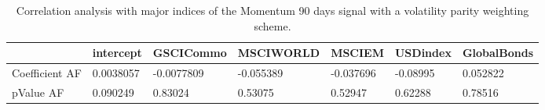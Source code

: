 \begin{table}[H]
\centering
\begin{tabular}{lllllll}
& intercept & GSCICommo & MSCIWORLD & MSCIEM & USDindex & GlobalBonds \\ 
\hline 
Coefficient AF & 0.0038057 & -0.0077809 & -0.055389 & -0.037696 & -0.08995 & 0.052822 \\ 
pValue AF & 0.090249 & 0.83024 & 0.53075 & 0.52947 & 0.62288 & 0.78516 \\ 
\hline
\end{tabular}
\caption{Correlation analysis with major indices of the Momentum 90 days signal with a volatility parity weighting scheme.}
\label{MOM90VP_AFACTOR}
\end{table}